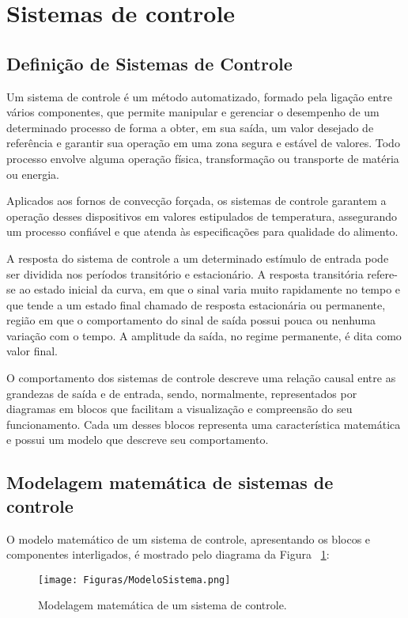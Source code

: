 \section{Sistemas de controle}
    \subsection{Definição de Sistemas de Controle}
        Um sistema de controle é um método automatizado, formado pela ligação entre vários componentes, que permite manipular e gerenciar o desempenho de um determinado processo de forma a obter, em sua saída, um valor desejado de referência \cite{Livro_Ogata} e garantir sua operação em uma zona segura e estável de valores. Todo processo envolve alguma operação física, transformação ou transporte de matéria ou energia.
        
        Aplicados aos fornos de convecção forçada, os sistemas de controle garantem a operação desses dispositivos em valores estipulados de temperatura, assegurando um processo confiável e que atenda às especificações para qualidade do alimento.
        
        A resposta do sistema de controle a um determinado estímulo de entrada pode ser dividida nos períodos transitório e estacionário. A resposta transitória refere-se ao estado inicial da curva, em que o sinal varia muito rapidamente no tempo e que tende a um estado final chamado de resposta estacionária ou permanente, região em que o comportamento do sinal de saída possui pouca ou nenhuma variação com o tempo. A amplitude da saída, no regime permanente, é dita como valor final.
        
        O comportamento dos sistemas de controle descreve uma relação causal entre as grandezas de saída e de entrada, sendo, normalmente, representados por diagramas em blocos que facilitam a visualização e compreensão do seu funcionamento. Cada um desses blocos representa uma característica matemática e possui um modelo que descreve seu comportamento.
    \subsection{Modelagem matemática de sistemas de controle}
        O modelo matemático de um sistema de controle, apresentando os blocos e componentes interligados, é mostrado pelo diagrama da Figura ~\ref{fig:ModeloSistema}:
        \begin{figure}[H]
            \centering
            \texttt{[image: Figuras/ModeloSistema.png]}
            \caption{Modelagem matemática de um sistema de controle.} \label{fig:ModeloSistema}
        \end{figure}
        
